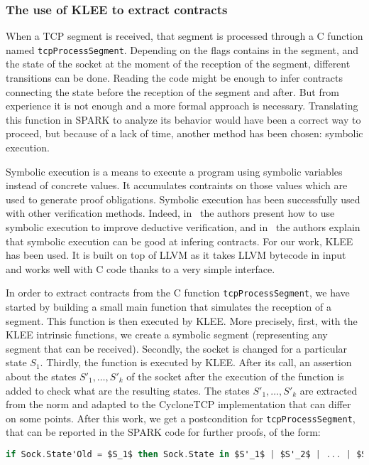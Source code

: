 \documentclass[runningheads]{llncs}
\begin{document}
\subsubsection{The use of KLEE to extract contracts}

    When a TCP segment is received, that segment is processed through a C function named \lstinline{tcpProcessSegment}.
    Depending on the flags contains in the segment, and the state of the socket at the moment of the reception of the segment, different
    transitions can be done. Reading the code might be enough to infer contracts connecting the state before the reception of the segment
    and after. But from experience it is not enough and a more formal approach is necessary. Translating this function in SPARK to analyze
    its behavior would have been a correct way to proceed, but because of a lack of time, another method has been chosen: symbolic execution.

    Symbolic execution is a means to execute a program using symbolic variables instead of concrete values. It accumulates contraints
    on those values which are used to generate proof obligations. Symbolic execution has been successfully used with other verification
    methods. Indeed, in~\cite{vanoverberghe2008using} the authors present how to use symbolic execution to improve deductive verification,
    and in~\cite{kassios2012comparing} the authors explain that symbolic execution can be good at infering contracts.
    For our work, KLEE has been used. It is built on top of LLVM as it takes LLVM bytecode in input
    and works well with C code thanks to a very simple interface.

    In order to extract contracts from the C function \lstinline{tcpProcessSegment}, we have started by building a small main function that
    simulates the reception of a segment. This function is then executed by KLEE. More precisely, first, with the KLEE intrinsic functions, we
    create a symbolic segment (representing any segment that can be received). Secondly, the socket is changed for a particular state $S_1$. Thirdly, the
    function is executed by KLEE. After its call, an assertion about the states $S'_1, \dots, S'_k$ of the socket after the execution
    of the function is added to check what are the resulting states. The states $S'_1, \dots, S'_k$ are extracted from the norm and adapted to the CycloneTCP
    implementation that can differ on some points.
    After this work, we get a postcondition for \lstinline{tcpProcessSegment}, that can be reported in the SPARK code for further proofs, of the form:
    \begin{lstlisting}[language=Ada,mathescape=true]
    if Sock.State'Old = $S_1$ then Sock.State in $S'_1$ | $S'_2$ | ... | $S'_k$
    \end{lstlisting}
\end{document}
